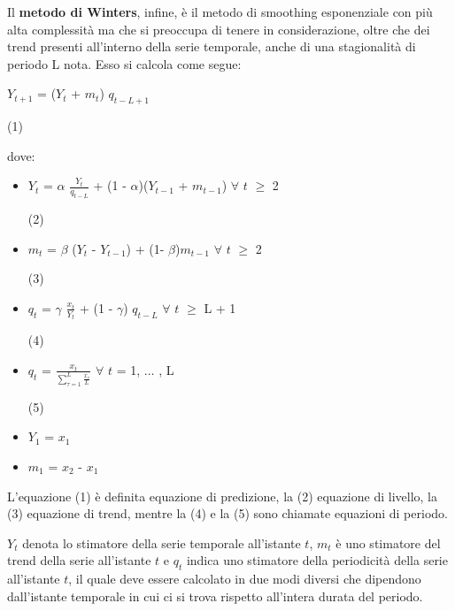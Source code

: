 \documentclass[12pt,a4paper,oneside,openright]{book}
\begin{document}
Il {\bfseries metodo di Winters}, infine, è il metodo di smoothing esponenziale con più alta complessità ma che si preoccupa di tenere in considerazione, oltre che dei trend presenti all'interno della serie temporale, anche di una stagionalità di periodo L nota. Esso si calcola come segue:

\begin{center}
$Y_{t+1}$ = ($Y_{t}$ + $m_{t}$) $q_{t-L+1}$
\end{center}
\begin{flushright}
(1)
\end{flushright}
dove:
\medskip \medskip
\begin{itemize}

\item $Y_{t}$ = $\alpha$ $\frac{Y_{t}}{q_{t-L} }$ + (1 - $\alpha$)($Y_{t-1}$ + $m_{t-1}$) $\forall$ $t$ $\geq$ 2 
\begin{flushright}
(2)
\end{flushright}
\item $m_{t}$ = $\beta$ ($Y_{t}$ - $Y_{t-1}$) + (1- $\beta$)$m_{t-1}$   $\forall$ $t$ $\geq$ 2
\begin{flushright}
(3)
\end{flushright}
\item $q_{t}$ = $\gamma$ $\frac{x_{t}}{Y_{t}}$ + (1 - $\gamma$) $q_{t-L}$  $\forall$ $t$ $\geq$ L + 1 
\begin{flushright}
(4)
\end{flushright}
\item $q_{t}$ = $\frac{x_{t}}{\sum_{\tau=1}^{L}{\frac{x_{\tau}}{L}}}$ $\forall$ $t$ = 1, $\dots$ , L
\begin{flushright}
(5)
\end{flushright}

\item $Y_{1}$ = $x_{1}$

\item $m_{1}$ = $x_{2}$ - $x_{1}$
\end{itemize}

L'equazione (1) è definita equazione di predizione, la (2) equazione di livello, la (3) equazione di trend, mentre la (4) e la (5) sono chiamate equazioni di periodo.

$Y_{t}$ denota lo stimatore della serie temporale all'istante $t$, $m_{t}$ è uno stimatore del trend della serie all'istante $t$ e $q_{t}$ indica uno stimatore della periodicità della serie all'istante $t$, il quale deve essere calcolato in due modi diversi che dipendono dall'istante temporale in cui ci si trova rispetto all'intera durata del periodo.
\end{document}
